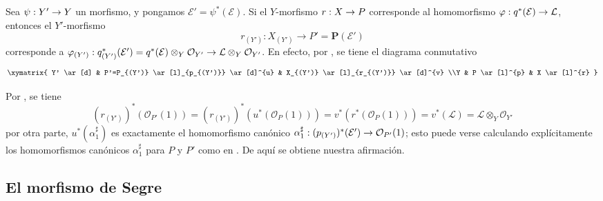 \documentclass[oneside,10pt]{amsart}
\makeatletter
\newcommand{\ega@arrow}[2]{\mathchoice{#1}{#2}{#2}{#2}}
\renewcommand{\to}{\ega@arrow{\longrightarrow}{\rightarrow}}
\let\EGAOriginalLabel\label
\renewcommand{\label}[1]{\phantomsection\EGAOriginalLabel{#1}}
\makeatother
\begin{document}
\begin{env}[4.2.10]
\label{II.4.2.10-fr}
Sea $\psi:Y'\to Y$ un morfismo, y pongamos $\mathcal{E}'=\psi^*(\mathcal{E})$.
Si el $Y$-morfismo $r:X\to P$ corresponde al homomorfismo $\varphi:q^*(\mathcal{E})\to\mathcal{L}$, entonces el $Y'$-morfismo
\[
  r_{(Y')}:X_{(Y')}\longrightarrow P'=\mathbf{P}(\mathcal{E}')
\]
corresponde a $\varphi_{(Y')}:q_{(Y')}^*(\mathcal{E}')=
  q^*(\mathcal{E})\otimes_Y\mathcal{O}_{Y'}\to
\mathcal{L}\otimes_Y\mathcal{O}_{Y'}$.
En efecto, por , se tiene el diagrama conmutativo
\[
  \xymatrix{
    Y' \ar[d]
    & P'=P_{(Y')} \ar[l]_{p_{(Y')}} \ar[d]^{u}
    & X_{(Y')} \ar[l]_{r_{(Y')}} \ar[d]^{v}
    \\Y
    & P \ar[l]^{p}
    & X \ar[l]^{r}
  }
\]

Por , se tiene
\[
  (r_{(Y')})^*(\mathcal{O}_{P'}(1))
  =(r_{(Y')})^*(u^*(\mathcal{O}_P(1)))
  =v^*(r^*(\mathcal{O}_P(1)))
  =v^*(\mathcal{L})=\mathcal{L}\otimes_Y\mathcal{O}_{Y'}
\]
por otra parte, $u^*(\alpha_1^\sharp)$ es exactamente el homomorfismo canónico $\alpha_1^\sharp:(p_{(Y')})^*(\mathcal{E}')\to\mathcal{O}_{P'}(1)$;
esto puede verse calculando explícitamente los homomorfismos canónicos $\alpha_1^\sharp$ para $P$ y $P'$ como en .
De aquí se obtiene nuestra afirmación.
\end{env}

\subsection{El morfismo de Segre}
\label{subsection:II.4.3-fr}
\end{document}
